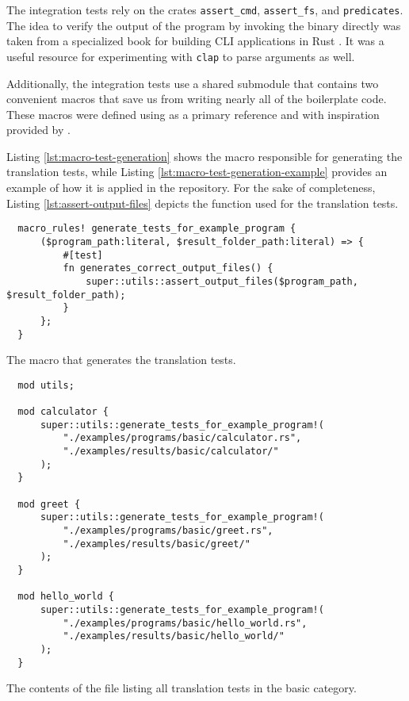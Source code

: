 The integration tests rely on the crates \texttt{assert\_cmd}, \texttt{assert\_fs},
and \texttt{predicates}.
The idea to verify the output of the program by invoking the binary directly was
taken from a specialized book for building \acrshort{CLI} applications in Rust \cite[Chap. 1.6]{rust-cli-book}.
It was a useful resource for experimenting with \texttt{clap} to parse arguments as well.

Additionally, the integration tests use a shared submodule \cite[Chap. 11.3]{rust-book}
that contains two convenient macros that save us from writing nearly all of the boilerplate code.
These macros were defined using \cite{rust-macros} as a primary reference
and with inspiration provided by \cite{oaten2023}.

Listing \ref{lst:macro-test-generation} shows the macro responsible for generating the translation tests,
while Listing \ref{lst:macro-test-generation-example} provides an example of how it is applied
in the repository. For the sake of completeness, Listing \ref{lst:assert-output-files}
depicts the function used for the translation tests.

\begin{listing}[!htbp]
  \begin{verbatim}
  macro_rules! generate_tests_for_example_program {
      ($program_path:literal, $result_folder_path:literal) => {
          #[test]
          fn generates_correct_output_files() {
              super::utils::assert_output_files($program_path, $result_folder_path);
          }
      };
  }  
  \end{verbatim}
  \caption{The macro that generates the translation tests.}
  \label{lst:macro-test-generation}
\end{listing}


\begin{listing}[!htbp]
  \begin{verbatim}
  mod utils;

  mod calculator {
      super::utils::generate_tests_for_example_program!(
          "./examples/programs/basic/calculator.rs",
          "./examples/results/basic/calculator/"
      );
  }
  
  mod greet {
      super::utils::generate_tests_for_example_program!(
          "./examples/programs/basic/greet.rs",
          "./examples/results/basic/greet/"
      );
  }
  
  mod hello_world {
      super::utils::generate_tests_for_example_program!(
          "./examples/programs/basic/hello_world.rs",
          "./examples/results/basic/hello_world/"
      );
  }    
  \end{verbatim}
  \caption{The contents of the file  listing all translation tests in the basic category.}
  \label{lst:macro-test-generation-example}
\end{listing}

